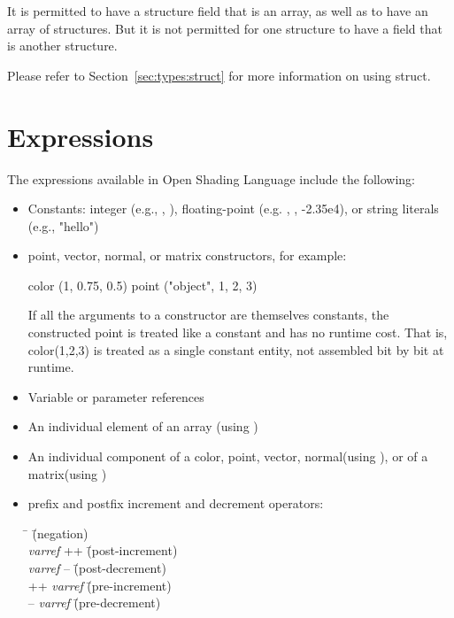 \documentclass[11pt,letterpaper]{book}
\def\langname{Open Shading Language\xspace}
\def\color{{\cf color}\xspace}
\def\matrix{{\cf matrix}\xspace}
\def\normal{{\cf normal}\xspace}
\def\point{{\cf point}\xspace}
\def\vector{{\cf vector}\xspace}
\begin{document}
It is permitted to have a structure field that is an array, as well as
to have an array of structures.  But it is not permitted for one
structure to have a field that is another structure.

Please refer to Section~\ref{sec:types:struct} for more information
on using {\cf struct}.


\section{Expressions}
\label{sec:expressions}

The expressions available in \langname include the following:

\begin{itemize}
\item Constants: integer (e.g., {}, {}), floating-point
  (e.g. {}, {}, {\cf -2.35e4}), or string literals (e.g., {\cf
  "hello"})

\item point, vector, normal, or matrix constructors, for example:

\begin{code}
    color (1, 0.75, 0.5)
    point ("object", 1, 2, 3)
\end{code}

If all the arguments to a constructor are themselves constants, the
constructed point is treated like a constant and has no runtime cost.
That is, {\cf color(1,2,3)} is treated as a single constant entity, not
assembled bit by bit at runtime.

\item Variable or parameter references

\item An individual element of an array (using {\cf [ ] })

\item An individual component of a \color,
\point, \vector, \normal (using {\cf [ ]}), 
or of a \matrix (using {\cf [][]})

\item prefix and postfix increment and decrement operators:

\begin{tabbing}
\hspace{.25in} \= \hspace{2in} \= (negation) \kill \\
\> \emph{varref} {\cf ++} \hspace{1in} \= (post-increment) \\
\> \emph{varref} {\cf --}  \hspace{1in} \= (post-decrement) \\
\> {\cf ++} \emph{varref} \hspace{1in} \= (pre-increment) \\
\> {\cf --} \emph{varref} \hspace{1in} \= (pre-decrement) \\
\end{tabbing}


\end{itemize}
\end{document}
